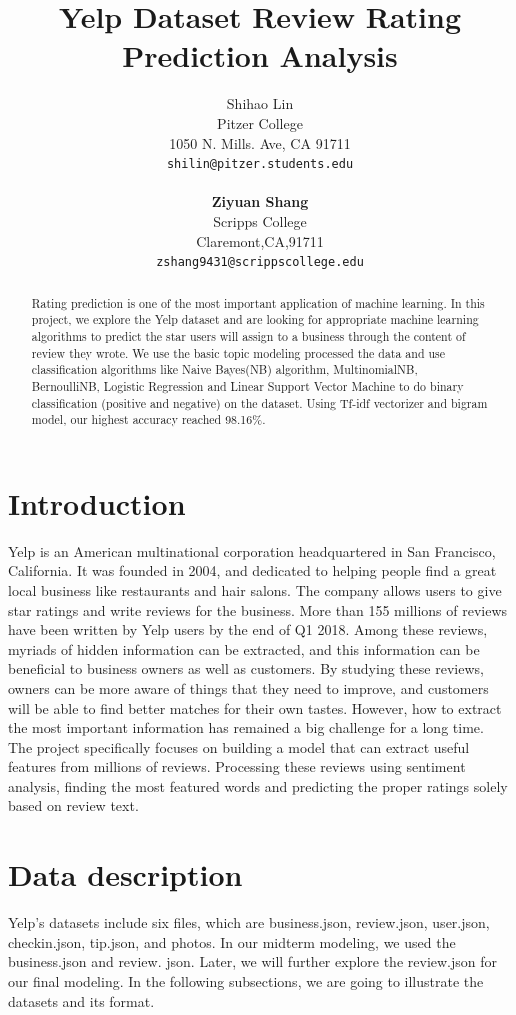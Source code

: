 \documentclass{article}
\title{Yelp Dataset Review Rating Prediction Analysis}
\author{
  Shihao Lin \\
  Pitzer College\\
  1050 N. Mills. Ave, CA 91711 \\
  \texttt{shilin@pitzer.students.edu} \\
  \\
   \textbf{Ziyuan Shang} \\
   Scripps College\\
   Claremont,CA,91711 \\
   \texttt{zshang9431@scrippscollege.edu} \\
 }
\begin{document}

\maketitle
\begin{abstract}
  Rating prediction is one of the most important
application of machine learning. In this project, 
we explore the Yelp dataset and are looking for appropriate machine learning algorithms to predict the star users will assign to a business through the content of review they wrote. We use the basic topic modeling processed the data and use classification algorithms like Naive Bayes(NB) algorithm, MultinomialNB, BernoulliNB, Logistic Regression and Linear Support Vector Machine to do binary classification (positive and negative) on the dataset. Using Tf-idf vectorizer and bigram model, our highest accuracy reached 98.16\%. 
\end{abstract}

\section{Introduction}
Yelp is an American multinational corporation headquartered in San Francisco, California. It was founded in 2004, and dedicated to helping people find a great local business like restaurants and hair salons. The company allows users to give star ratings and write reviews for the business. More than 155 millions of reviews have been written by Yelp users by the end of Q1 2018. Among these reviews, myriads of hidden information can be extracted, and this information can be beneficial to business owners as well as customers. By studying these reviews, owners can be more aware of things that they need to improve, and customers will be able to find better matches for their own tastes. However, how to extract the most important information has remained a big challenge for a long time. The project specifically focuses on building a model that can extract useful features from millions of reviews. Processing these reviews using sentiment analysis, finding the most featured words and predicting the proper ratings solely based on review text.

\section{Data description}

Yelp's datasets include six files, which are business.json, review.json, user.json, checkin.json, tip.json, and photos. In our midterm modeling, we used the business.json and review. json. Later, we will further explore the review.json for our final modeling. In the following subsections, we are going to illustrate the datasets and its format.
\end{document}
